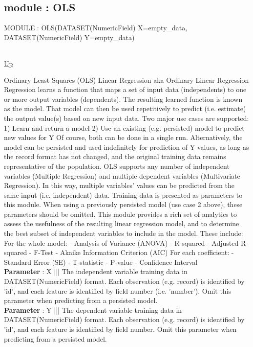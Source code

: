 \subsection*{module : OLS}
\hypertarget{ecldoc:linearregression.ols}{MODULE : OLS(DATASET(NumericField) X=empty\_data, DATASET(NumericField) Y=empty\_data)} \\
\hyperlink{ecldoc:}{Up} \\
\par
Ordinary Least Squares (OLS) Linear Regression aka Ordinary Linear Regression Regression learns a function that maps a set of input data (independents) to one or more output variables (dependents). The resulting learned function is known as the model. That model can then be used repetitively to predict (i.e. estimate) the output value(s) based on new input data. Two major use cases are supported: 1) Learn and return a model 2) Use an existing (e.g. persisted) model to predict new values for Y Of course, both can be done in a single run. Alternatively, the model can be persisted and used indefinitely for prediction of Y values, as long as the record format has not changed, and the original training data remains representative of the population. OLS supports any number of independent variables (Multiple Regression) and multiple dependent variables (Multivariate Regression). In this way, multiple variables' values can be predicted from the same input (i.e. independent) data. Training data is presented as parameters to this module. When using a previously persisted model (use case 2 above), these parameters should be omitted. This module provides a rich set of analytics to assess the usefulness of the resulting linear regression model, and to determine the best subset of independent variables to include in the model. These include: For the whole model: - Analysis of Variance (ANOVA) - R-squared - Adjusted R-squared - F-Test - Akaike Information Criterion (AIC) For each coefficient: - Standard Error (SE) - T-statistic - P-value - Confidence Interval \\
\textbf{Parameter} : X ||| The independent variable training data in DATASET(NumericField) format. Each observation (e.g. record) is identified by 'id', and each feature is identified by field number (i.e. 'number'). Omit this parameter when predicting from a persisted model. \\
\textbf{Parameter} : Y ||| The dependent variable training data in DATASET(NumericField) format. Each observation (e.g. record) is identified by 'id', and each feature is identified by field number. Omit this parameter when predicting from a persisted model. \\
